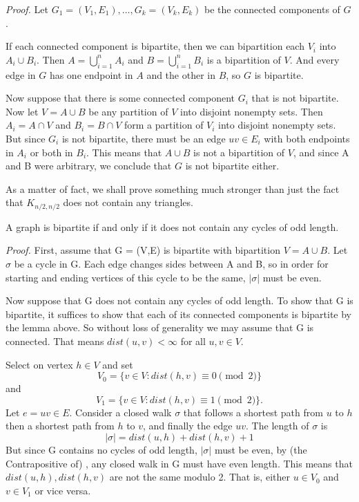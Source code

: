 \documentclass{tufte-handout}
\begin{document}
\textit{Proof.} Let \(G_1 = (V_1,E_1), \ldots, G_k = (V_k,E_k) \) be the connected components of \( G \).

If each connected component is bipartite, then we can bipartition each \( V_i \) into \( A_i \cup B_i \).
Then \( A = \bigcup_{i=1}^{n} A_i \) and \( B = \bigcup_{i=1}^{n} B_i \) is a bipartition of \( V \).
And every edge in \( G \) has one endpoint in \( A \) and the other in \( B \), so \( G \) is bipartite.

Now suppose that there is some connected component \( G_i \) that is not bipartite. Now let
\(V = A\cup B \) be any partition of \( V \) into disjoint nonempty sets. Then \(A_i=A\cap V\) and
\(B_i = B\cap V\)  form a partition of \( V_i \) into disjoint nonempty sets. But since \( G_i \) is not bipartite,
there must be an edge \( uv \in E_i \) with both endpoints in \( A_i \) or both in \( B_i \).
This means that \( A \cup B \) is not a bipartition of \( V \), and since A and B were arbitrary, we conclude that
\( G \) is not bipartite either. \qedsymbol

As a matter of fact, we shall prove something much stronger than just the fact that \( K_{n/2,n/2} \)
does not contain any triangles. 
\begin{Theorem}
    A graph is bipartite if and only if it does not contain any cycles of odd length.
\end{Theorem}
\textit{Proof.} First, assume that G = (V,E) is bipartite with bipartition \( V = A \cup B \).
Let \(\sigma\) be a cycle in G. Each edge changes sides between A and B, so in order
for starting and ending vertices of this cycle to be the same, \(\left|\sigma\right|\)
must be even.

Now suppose that G does not contain any cycles of odd length. To show that G is bipartite,
it suffices to show that each of its connected components is bipartite by the lemma above.
So without loss of generality we may assume that G is connected.
That means \(dist(u,v) < \infty\) for all \(u,v \in V\).

Select on vertex \( h\in V   \) and set
\[V_0 = \{v\in V: dist(h,v) \equiv 0 \pmod2\}\]
and
\[V_1 = \{v\in V: dist(h,v) \equiv 1 \pmod2\}.\]
Let \( e = uv \in E \). Consider a closed walk \(\sigma\) that follows a shortest path from \( u \) to \( h \)
then a shortest path from \( h \) to \( v \), and finally the edge \( uv \). The length of \(\sigma\) is
\[ \left|\sigma\right| = dist(u,h) + dist(h,v) + 1 \]
But since G contains no cycles of odd length, \(\left|\sigma\right|\) must be even, by (the Contrapositive of) ,
any closed walk in G must have even length. This means that \( dist(u,h),dist(h,v)\) are not the same modulo 2.
That is, either \(u \in V_0\) and \(v \in V_1\) or vice versa. \qedsymbol
\end{document}
